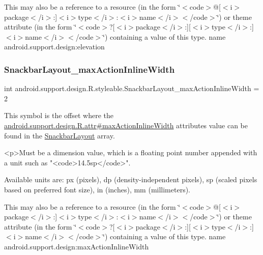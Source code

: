 This may also be a reference to a resource (in the form \char`\"{}$<$code$>$@\mbox{[}$<$i$>$package$<$/i$>$\+:\mbox{]}$<$i$>$type$<$/i$>$\+:$<$i$>$name$<$/i$>$$<$/code$>$\char`\"{}) or theme attribute (in the form \char`\"{}$<$code$>$?\mbox{[}$<$i$>$package$<$/i$>$\+:\mbox{]}\mbox{[}$<$i$>$type$<$/i$>$\+:\mbox{]}$<$i$>$name$<$/i$>$$<$/code$>$\char`\"{}) containing a value of this type.  name android.\+support.\+design\+:elevation \mbox{\label{classandroid_1_1support_1_1design_1_1R_1_1styleable_a66890a4c37503ae7fd6e09cbefc592bf}} 
\subsubsection{\texorpdfstring{Snackbar\+Layout\+\_\+max\+Action\+Inline\+Width}{SnackbarLayout\_maxActionInlineWidth}}
{\footnotesize\ttfamily int android.\+support.\+design.\+R.\+styleable.\+Snackbar\+Layout\+\_\+max\+Action\+Inline\+Width = 2\hspace{0.3cm}{\ttfamily [static]}}

This symbol is the offset where the \hyperlink{classandroid_1_1support_1_1design_1_1R_1_1attr_a77cee121956a85a6e6111ccdc6aa4087}{android.\+support.\+design.\+R.\+attr\#max\+Action\+Inline\+Width} attribute\textquotesingle{}s value can be found in the \hyperlink{classandroid_1_1support_1_1design_1_1R_1_1styleable_ade77d86fa8e689770b5436467abdc2db}{Snackbar\+Layout} array.

\begin{DoxyVerb}      <p>Must be a dimension value, which is a floating point number appended with a unit such as "<code>14.5sp</code>".
\end{DoxyVerb}
 Available units are\+: px (pixels), dp (density-\/independent pixels), sp (scaled pixels based on preferred font size), in (inches), mm (millimeters). 

This may also be a reference to a resource (in the form \char`\"{}$<$code$>$@\mbox{[}$<$i$>$package$<$/i$>$\+:\mbox{]}$<$i$>$type$<$/i$>$\+:$<$i$>$name$<$/i$>$$<$/code$>$\char`\"{}) or theme attribute (in the form \char`\"{}$<$code$>$?\mbox{[}$<$i$>$package$<$/i$>$\+:\mbox{]}\mbox{[}$<$i$>$type$<$/i$>$\+:\mbox{]}$<$i$>$name$<$/i$>$$<$/code$>$\char`\"{}) containing a value of this type.  name android.\+support.\+design\+:max\+Action\+Inline\+Width \mbox{\label{classandroid_1_1support_1_1design_1_1R_1_1styleable_ac36e55e5a1c717e866dcadd92552fa64}} 
